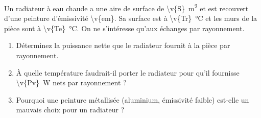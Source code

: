 Un radiateur à eau chaude a une aire de surface de \qty{\v{S}}{m^2} et est recouvert d'une peinture d'émissivité \num{\v{em}}. Sa surface est à \qty{\v{Tr}}{\degreeCelsius} et les murs de la pièce sont à \qty{\v{Te}}{\degreeCelsius}. On ne s'intéresse qu'aux échanges par rayonnement.

\begin{enumerate}[label=\alph*)]
    \item Déterminez la puissance nette que le radiateur fournit à la pièce par rayonnement.
    \item À quelle température faudrait-il porter le radiateur pour qu'il fournisse \qty{\v{Pv}}{W} nets par rayonnement ?
    \item Pourquoi une peinture métallisée (aluminium, émissivité faible) est-elle un mauvais choix pour un radiateur ?
\end{enumerate}
